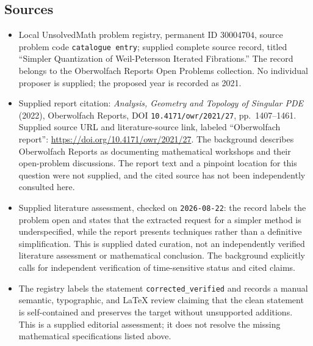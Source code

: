 \documentclass[11pt]{article}
\begin{document}
\subsection{Sources}
\begin{itemize}
\item Local UnsolvedMath problem registry, permanent ID \(30004704\), source problem code \texttt{catalogue entry}; supplied complete source record, titled ``Simpler Quantization of Weil-Petersson Iterated Fibrations.'' The record belongs to the Oberwolfach Reports Open Problems collection. No individual proposer is supplied; the proposed year is recorded as 2021.
\item Supplied report citation: \emph{Analysis, Geometry and Topology of Singular PDE} (2022), Oberwolfach Reports, DOI \texttt{10.4171/owr/2021/27}, pp.\ 1407--1461. Supplied source URL and literature-source link, labeled ``Oberwolfach report'': \url{https://doi.org/10.4171/owr/2021/27}. The background describes Oberwolfach Reports as documenting mathematical workshops and their open-problem discussions. The report text and a pinpoint location for this question were not supplied, and the cited source has not been independently consulted here.
\item Supplied literature assessment, checked on \texttt{2026-08-22}: the record labels the problem open and states that the extracted request for a simpler method is underspecified, while the report presents techniques rather than a definitive simplification. This is supplied dated curation, not an independently verified literature assessment or mathematical conclusion. The background explicitly calls for independent verification of time-sensitive status and cited claims.
\item The registry labels the statement \texttt{corrected\_verified} and records a manual semantic, typographic, and LaTeX review claiming that the clean statement is self-contained and preserves the target without unsupported additions. This is a supplied editorial assessment; it does not resolve the missing mathematical specifications listed above.
\end{itemize}
\end{document}
